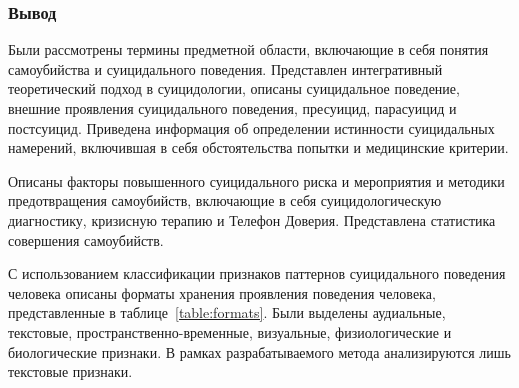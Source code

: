 \subsubsection*{Вывод}

Были рассмотрены термины предметной области, включающие в себя понятия самоубийства и суицидального поведения. 
Представлен интегративный теоретический подход в суицидологии, описаны суицидальное поведение, внешние проявления суицидального поведения, пресуицид, парасуицид и постсуицид. 
Приведена информация об определении истинности суицидальных намерений, включившая в себя обстоятельства попытки и медицинские критерии. 

Описаны факторы повышенного суицидального риска и мероприятия и методики предотвращения самоубийств, включающие в себя суицидологическую диагностику, кризисную терапию и Телефон Доверия.
Представлена статистика совершения самоубийств.


С использованием классификации признаков паттернов суицидального поведения человека описаны форматы хранения проявления поведения человека, представленные в таблице~\ref{table:formats}. 
Были выделены аудиальные, текстовые, пространственно-временные, визуальные, физиологические и биологические признаки.
В рамках разрабатываемого метода анализируются лишь текстовые признаки.

